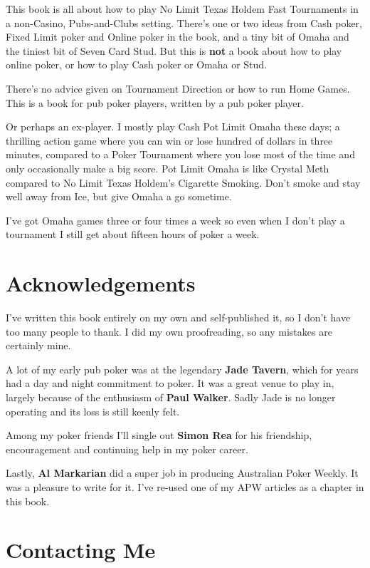 This book is all about how to play No Limit Texas Holdem Fast
Tournaments in a non-Casino, Pubs-and-Clubs setting. There's one or
two ideas from Cash poker, Fixed Limit poker and Online poker in the
book, and a tiny bit of Omaha and the tiniest bit of Seven Card Stud.
But this is \textbf{not} a book about how to play online poker, or how
to play Cash poker or Omaha or Stud.

There's no advice given on Tournament Direction or how to run Home
Games. This is a book for pub poker players, written by a pub poker
player.

Or perhaps an ex-player. I mostly play Cash Pot Limit Omaha these days;
a thrilling action game where you can win or lose hundred of dollars
in three minutes, compared to a Poker Tournament where you lose most of
the time and only occasionally make a big score. Pot Limit Omaha
is like Crystal Meth compared to No Limit Texas Holdem's Cigarette
Smoking. Don't smoke and stay well away from Ice, but give Omaha a go
sometime.

I've got Omaha games three or four times a week so even when I don't
play a tournament I still get about fifteen hours of poker a week.

\section{Acknowledgements}

I've written this book entirely on my own and self-published it, so I don't
have too many people to thank. I did my own proofreading, so any mistakes
are certainly mine.

A lot of my early pub poker was at the legendary \textbf{Jade Tavern},
which for years had a day and night commitment to poker.
It was a great venue to play in, largely because of the enthusiasm
of \textbf{Paul Walker}. Sadly Jade is no longer operating and
its loss is still keenly felt.

Among my poker friends I'll single out \textbf{Simon Rea} for his
friendship, encouragement and continuing help in my poker career.

Lastly, \textbf{Al Markarian} did a super job in producing Australian
Poker Weekly. It was a pleasure to write for it. I've re-used one of
my APW articles as a chapter in this book.

\section{Contacting Me}

